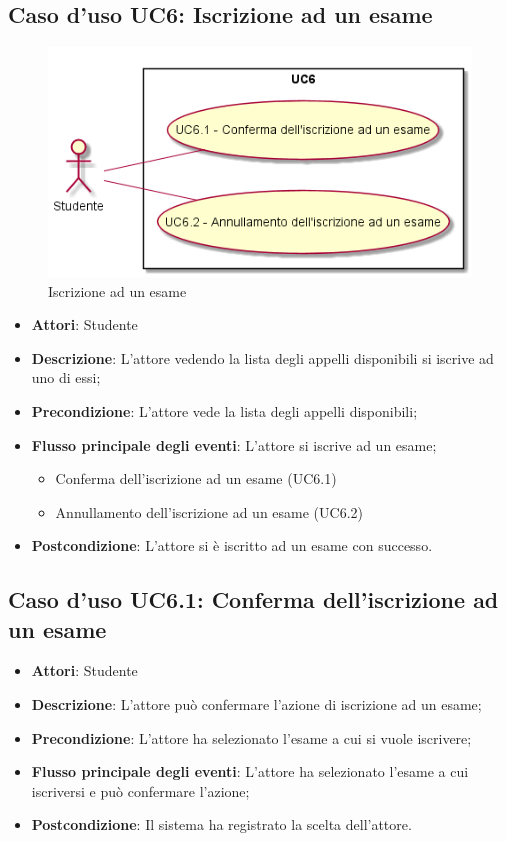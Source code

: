 \subsection{Caso d'uso \texorpdfstring{UC6}{UC6}: Iscrizione ad un esame}
\begin{figure} [H]
\centering
\includegraphics[scale=0.45]{./img/UC6.png}
\caption{Iscrizione ad un esame}\label{}
\end{figure}
\begin{itemize}
\item \textbf{Attori}: Studente
\item \textbf{Descrizione}: L'attore vedendo la lista degli appelli disponibili si iscrive ad uno di essi;
\item \textbf{Precondizione}: L'attore vede la lista degli appelli disponibili;
\item \textbf{Flusso principale degli eventi}: L'attore si iscrive ad un esame;
\begin{itemize}
\item Conferma dell'iscrizione ad un esame (UC6.1)
\item Annullamento dell'iscrizione ad un esame (UC6.2)
\end{itemize}
\item \textbf{Postcondizione}: L'attore si è iscritto ad un esame con successo.
\end{itemize}
\subsection{Caso d'uso \texorpdfstring{UC6.1}{UC6.1}: Conferma dell'iscrizione ad un esame}
\begin{itemize}
\item \textbf{Attori}: Studente
\item \textbf{Descrizione}: L'attore può confermare l'azione di iscrizione ad un esame;
\item \textbf{Precondizione}: L'attore ha selezionato l'esame a cui si vuole iscrivere;
\item \textbf{Flusso principale degli eventi}: L'attore ha selezionato l'esame a cui iscriversi e può confermare l'azione;
\item \textbf{Postcondizione}: Il sistema ha registrato la scelta dell'attore.
\end{itemize}
